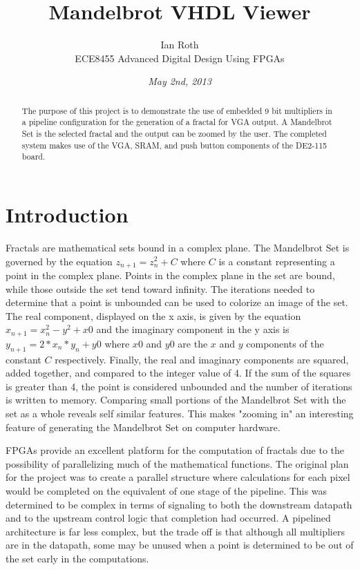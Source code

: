 \documentclass[titlepage]{article}      %
\date{\small\it May 2nd, 2013}
\title{Mandelbrot VHDL Viewer}
\author{ Ian Roth \\
{\small ECE8455 Advanced Digital Design Using FPGAs}}
\begin{document}
\maketitle

\begin{abstract}
The purpose of this project is to demonstrate the use of embedded 9 bit multipliers in a pipeline configuration for the generation of a fractal for VGA output. A Mandelbrot Set is the selected fractal and the output can be zoomed by the user. The completed system makes use of the VGA, SRAM, and push button components of the DE2-115 board.
\end{abstract}

\section{Introduction}
Fractals are mathematical sets bound in a complex plane. The Mandelbrot Set is governed by the equation $z_{n + 1} = z^2_{n} + C$ where $C$ is a constant representing a point in the complex plane. Points in the complex plane in the set are bound, while those outside the set tend toward infinity. The iterations needed to determine that a point is unbounded can be used to colorize an image of the set. The real component, displayed on the x axis, is given by the equation $x_{n+1} = x^2_{n} - y^2 + x{0}$ and the imaginary component in the y axis is $y_{n+1} = 2*x_{n}*y_{n} + y{0}$ where $x{0}$ and $y{0}$ are the $x$ and $y$ components of the constant $C$ respectively. Finally, the real and imaginary components are squared, added together, and compared to the integer value of 4. If the sum of the squares is greater than 4, the point is considered unbounded and the number of iterations is written to memory. Comparing small portions of the Mandelbrot Set with the set as a whole reveals self similar features. This makes "zooming in" an interesting feature of generating the Mandelbrot Set on computer hardware.

FPGAs provide an excellent platform for the computation of fractals due to the possibility of parallelizing much of the mathematical functions. The original plan for the project was to create a parallel structure where calculations for each pixel would be completed on the equivalent of one stage of the pipeline. This was determined to be complex in terms of signaling to both the downstream datapath and to the upstream control logic that completion had occurred. A pipelined architecture is far less complex, but the trade off is that although all multipliers are in the datapath, some may be unused when a point is determined to be out of the set early in the computations.
\end{document}
